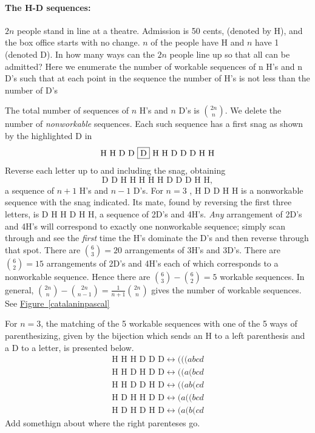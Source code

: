 \documentclass[10pt,]{book}
\theoremstyle{plain}
\theoremstyle{definition}
\theoremstyle{definition}
\numberwithin{equation}{chapter}
\newcommand{\alert}{\fbox}
\begin{document}
\paragraph[{The H-D sequences:}]{The H-D sequences:}\hypertarget{paragraphs-2}{}
\hypertarget{p-57}{}%
\(2n\) people stand in line at a theatre. Admission is 50 cents, (denoted by H), and the box office starts with no change. \(n\) of the people have H and \(n\) have \textdollar{}1 (denoted D). In how many ways can the \(2n\) people line up so that all can be admitted? Here we enumerate the number of workable sequences of n H's and n D's such that at each point in the sequence the number of H's is not less than the number of D's%
\par
\hypertarget{p-58}{}%
The total number of sequences of \(n\) H's and \(n\) D's is \(\binom{2n}{n}\). We delete the number of \emph{nonworkable} sequences. Each such sequence has a first snag as shown by the highlighted D in%
\begin{equation*}
\text{H\ H\ D\ D\ \alert{D}\ H\ H\ D\ D\ D\ H\ H}
\end{equation*}
Reverse each letter up to and including the snag, obtaining%
\begin{equation*}
\text{D D H H H H H D D D H H},
\end{equation*}
a sequence of \(n+1\) H's and \(n-1\) D's. For \(n = 3\) , H D \alert{D} D H H is a nonworkable sequence with the snag indicated. Its mate, found by reversing the first three letters, is D H H D H H, a sequence of 2D's and 4H's. \emph{Any} arrangement of 2D's and 4H's will correspond to exactly one nonworkable sequence; simply scan through and see the \emph{first} time the H's dominate the D's and then reverse through that spot. There are \(\binom{6}{3}
= 20\) arrangements of 3H's and 3D's. There are \(\binom{6}{2}
= 15\) arrangements of 2D's and 4H's each of which corresponds to a nonworkable sequence. Hence there are \(\binom{6}{3}
-\binom{6}{2} = 5\) workable sequences. In general, \(\binom{2n}{n}  - \binom{2n}{n - 1} = \frac{1}{n + 1}\binom{2n}{n}\) gives the number of workable sequences. See \hyperref[catalaninpascal]{Figure~\ref{catalaninpascal}}%
\par
\hypertarget{p-59}{}%
For \(n=3\), the matching of the 5 workable sequences with one of the 5 ways of parenthesizing, given by the bijection which sends an H to a left parenthesis and a D to a letter, is presented below.%
%
\begin{gather*}
\text{H H H D D D} \leftrightarrow  (((abcd \\
\text{H H D H D D} \leftrightarrow  ((a(bcd \\
\text{H H D D H D} \leftrightarrow  ((ab(cd \\
\text{H D H H D D} \leftrightarrow  (a((bcd \\
\text{H D H D H D} \leftrightarrow  (a(b(cd 
\end{gather*}
Add somethign about where the right parenteses go.\typeout{************************************************}
\typeout{************************************************}
\end{document}
